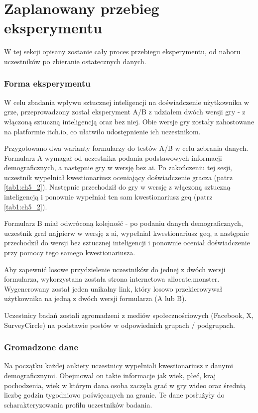 \section{Zaplanowany przebieg eksperymentu}\label{section:ch6_3}

W tej sekcji opisany zostanie cały proces przebiegu eksperymentu, od naboru uczestników po
zbieranie ostatecznych danych.

\subsubsection*{Forma eksperymentu}

W celu zbadania wpływu sztucznej inteligencji na doświadczenie użytkownika w grze, przeprowadzony
został eksperyment A/B z udziałem dwóch wersji gry - z włączoną sztuczną inteligencją oraz bez niej.
Obie wersje gry zostały zahostowane na platformie itch.io, co ułatwiło udostępnienie ich uczestnikom.

Przygotowano dwa warianty formularzy do testów A/B w celu zebrania danych. Formularz A wymagał od
uczestnika podania podstawowych informacji demograficznych, a następnie gry w wersję bez \gls{ai}. Po
zakończeniu tej sesji, uczestnik wypełniał kwestionariusz oceniający doświadczenie gracza (patrz \ref{tab1:ch5_2}).
Następnie przechodził do gry w wersję z włączoną sztuczną inteligencją i ponownie wypełniał ten
sam kwestionariusz \gls{geq} (patrz \ref{tab1:ch5_2}).

Formularz B miał odwróconą kolejność - po podaniu danych demograficznych, uczestnik grał najpierw
w wersję z \gls{ai}, wypełniał kwestionariusz \gls{geq}, a następnie przechodził do wersji bez sztucznej
inteligencji i ponownie oceniał doświadczenie przy pomocy tego samego kwestionariusza.

Aby zapewnić losowe przydzielenie uczestników do jednej z dwóch wersji formularza, wykorzystana
została strona internetowa allocate.monster. Wygenerowany został jeden unikalny link, który losowo
przekierowywał użytkownika na jedną z dwóch wersji formularza (A lub B).

Uczestnicy badań zostali zgromadzeni z mediów społecznościowych (Facebook, X, SurveyCircle) na podstawie
postów w odpowiednich grupach / podgrupach.

\subsubsection*{Gromadzone dane}

Na początku każdej ankiety uczestnicy wypełniali kwestionariusz z danymi demograficznymi. Obejmował
on takie informacje jak wiek, płeć, kraj pochodzenia, wiek w którym dana osoba zaczęła grać w gry
wideo oraz średnią liczbę godzin tygodniowo poświęcanych na granie. Te dane posłużyły do
scharakteryzowania profilu uczestników badania.

